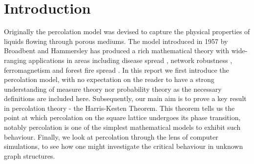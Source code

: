 \documentclass[a4paper,11pt]{article}
\theoremstyle{definition}
\begin{document}
\section{Introduction}
Originally the percolation model was devised to capture the physical properties of liquids flowing through porous mediums. The model introduced in 1957 by Broadbent and Hammersley \cite{broadbent_hammersley_1957} has produced a rich mathematical theory with wide-ranging applications in areas including disease spread \cite{meyers2007contact}, network robustness \cite{callaway2000network}, ferromagnetism \cite{aizenman1991strict} and forest fire spread \cite{stauffer2018introduction}.
In this report we first introduce the percolation model, with no expectation on the reader to have a strong understanding of measure theory nor probability theory as the necessary definitions are included here. Subsequently, our main aim is to prove a key result in percolation theory - the Harris-Kesten Theorem. This theorem tells us the point at which percolation on the square lattice undergoes its phase transition, notably percolation is  one of the simplest mathematical models to exhibit such behaviour. Finally, we look at percolation through the lens of computer simulations, to see how one might investigate the critical behaviour in unknown graph structures.








\end{document}
